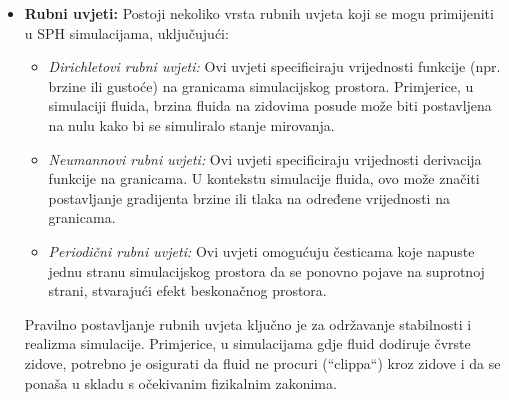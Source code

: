 \documentclass[diplomskirad]{fer}
\begin{document}
    \begin{itemize}
        \item \textbf{Rubni uvjeti:} Postoji nekoliko vrsta rubnih uvjeta koji se mogu primijeniti u SPH simulacijama, uključujući:
        \begin{itemize}
            \item \textit{Dirichletovi rubni uvjeti:} Ovi uvjeti specificiraju vrijednosti funkcije (npr. brzine ili gustoće) na granicama simulacijskog prostora. Primjerice, u simulaciji fluida, brzina fluida na zidovima posude može biti postavljena na nulu kako bi se simuliralo stanje mirovanja.
            \item \textit{Neumannovi rubni uvjeti:} Ovi uvjeti specificiraju vrijednosti derivacija funkcije na granicama. U kontekstu simulacije fluida, ovo može značiti postavljanje gradijenta brzine ili tlaka na određene vrijednosti na granicama.
            \item \textit{Periodični rubni uvjeti:} Ovi uvjeti omogućuju česticama koje napuste jednu stranu simulacijskog prostora da se ponovno pojave na suprotnoj strani, stvarajući efekt beskonačnog prostora.
        \end{itemize}
        Pravilno postavljanje rubnih uvjeta ključno je za održavanje stabilnosti i realizma simulacije.
        Primjerice, u simulacijama gdje fluid dodiruje čvrste zidove, potrebno je osigurati da fluid ne procuri (``clippa``) kroz zidove i da se ponaša u skladu s očekivanim fizikalnim zakonima.


\end{itemize}
\end{document}
